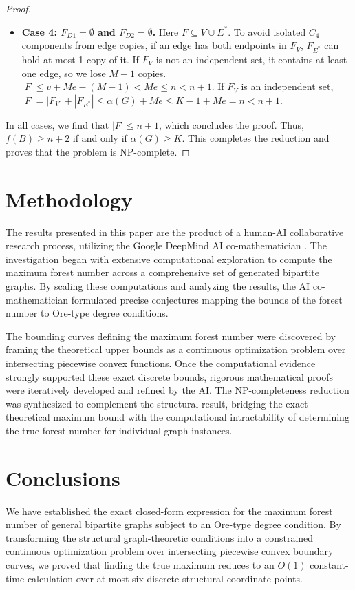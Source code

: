 \documentclass[a4paper]{amsart}
\begin{document}
\begin{proof}
\begin{itemize}
        \item \textbf{Case 4: $F_{D1} = \emptyset$ and $F_{D2} = \emptyset$.} Here $F \subseteq V \cup E^*$. To avoid isolated $C_4$ components from edge copies, if an edge has both endpoints in $F_V$, $F_{E^*}$ can hold at most 1 copy of it. If $F_V$ is not an independent set, it contains at least one edge, so we lose $M-1$ copies. $|F| \le v + M e - (M-1) < M e \le n < n+1$. If $F_V$ is an independent set, $|F| = |F_V| + |F_{E^*}| \le \alpha(G) + M e \le K-1 + M e = n < n+1$.
    \end{itemize}
    In all cases, we find that $|F| \le n+1$, which concludes the proof. Thus, $f(B) \ge n+2$ if and only if $\alpha(G) \ge K$. This completes the reduction and proves that the problem is NP-complete.
\end{proof}

\section{Methodology}

The results presented in this paper are the product of a human-AI collaborative research process, utilizing the Google DeepMind AI co-mathematician \cite{zheng2026}. The investigation began with extensive computational exploration to compute the maximum forest number across a comprehensive set of generated bipartite graphs. By scaling these computations and analyzing the results, the AI co-mathematician formulated precise conjectures mapping the bounds of the forest number to Ore-type degree conditions. 

The bounding curves defining the maximum forest number were discovered by framing the theoretical upper bounds as a continuous optimization problem over intersecting piecewise convex functions. Once the computational evidence strongly supported these exact discrete bounds, rigorous mathematical proofs were iteratively developed and refined by the AI. The NP-completeness reduction was synthesized to complement the structural result, bridging the exact theoretical maximum bound with the computational intractability of determining the true forest number for individual graph instances. 

\section{Conclusions}

We have established the exact closed-form expression for the maximum forest number of general bipartite graphs subject to an Ore-type degree condition.
By transforming the structural graph-theoretic conditions into a constrained continuous optimization problem over intersecting piecewise convex boundary curves, we proved that finding the true maximum reduces to an $O(1)$ constant-time calculation over at most six discrete structural coordinate points. 
\end{document}
